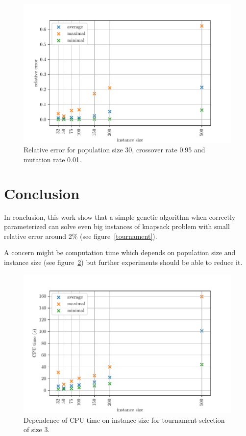 \documentclass{article}
\begin{document}
\begin{figure}[ht]
\vskip 0.2in
\begin{center}
\centerline{\includegraphics[width=\columnwidth]{params}}
\caption{Relative error for population size 30, crossover rate 0.95
and mutation rate 0.01.}
\label{params}
\end{center}
\vskip -0.2in
\end{figure}

\section{Conclusion}

In conclusion, this work show that a simple genetic algorithm
when correctly parameterized can solve even big instances of knapsack problem
with small relative error around 2\% (see figure~\ref{tournament}).

A concern might be computation time which depends on population size
and instance size (see figure~\ref{time})
but further experiments should be able to reduce it.

\begin{figure}[ht]
\vskip 0.2in
\begin{center}
\centerline{\includegraphics[width=\columnwidth]{time}}
\caption{Dependence of CPU time on instance size for tournament selection
of size 3.}
\label{time}
\end{center}
\vskip -0.2in
\end{figure}




\end{document}
